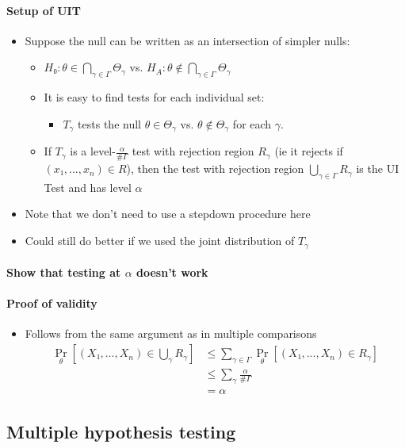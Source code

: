 \paragraph{Setup of UIT}
\begin{itemize}
\item Suppose the null can be written as an intersection of simpler nulls:
\begin{itemize}
\item $H₀: θ ∈ ⋂_{γ ∈ Γ} Θ_γ$ vs.  $H_A: θ ∉ ⋂_{γ ∈ Γ} Θ_γ$
\item It is easy to find tests for each individual set:
\begin{itemize}
\item $T_γ$ tests the null $θ ∈ Θ_γ$ vs. $θ ∉ Θ_γ$ for each $γ$.
\end{itemize}
\item If $T_γ$ is a level-$\frac{α}{\# Γ}$ test with rejection region
  $R_γ$ (ie it rejects if $(x₁,...,x_n) ∈ R$), then the test with
  rejection region $⋃_{γ ∈ Γ} R_γ$ is the UI Test and has level $α$
\end{itemize}
\item Note that we don't need to use a stepdown procedure here
\item Could still do better if we used the joint distribution of $T_γ$
\end{itemize}

\paragraph{Show that testing at $α$ doesn't work}

\paragraph{Proof of validity}
\begin{itemize}
\item Follows from the same argument as in multiple comparisons
  \begin{align*}
    \Pr_θ[(X₁,...,X_n) ∈ ⋃_{γ} R_γ]
    &≤ ∑_{γ ∈ Γ} \Pr_θ[(X₁,...,X_n) ∈ R_γ] \\
    &≤ ∑_γ \frac{α}{\#Γ} \\
    &= α
  \end{align*}
\end{itemize}

\subsection{Multiple hypothesis testing}

